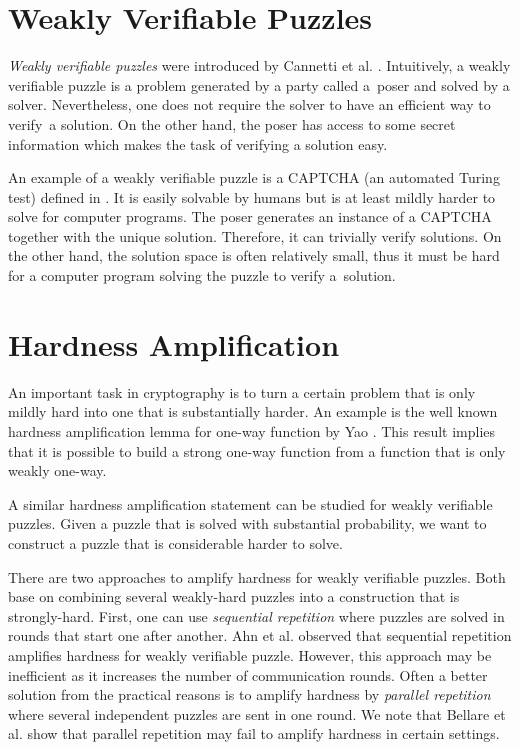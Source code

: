 \section{Weakly Verifiable Puzzles}
\textit{Weakly verifiable puzzles} were introduced by Cannetti et al. \cite{canetti2005hardness}.
Intuitively, a weakly verifiable puzzle is a problem generated by a party called a~poser
and solved by a solver. Nevertheless, one does not require the solver to have an efficient way to verify~a solution.
On the other hand, the poser has access to some secret information which makes the task of verifying a solution easy.

An example of a weakly verifiable puzzle is a CAPTCHA (an automated Turing test) defined in \cite{von2003captcha}.
It is easily solvable by humans but is at least mildly harder to solve for computer programs.
The poser generates an instance of a CAPTCHA together with the unique solution.
Therefore, it can trivially verify solutions.
On the other hand, the solution space is often relatively small,
thus it must be hard for a computer program solving the puzzle to verify a~solution.

\section{Hardness Amplification}
An important task in cryptography is to turn a certain problem that is only mildly hard into one that is substantially harder.
An example is the well known hardness amplification lemma for one-way function by Yao \cite{yao1982theory}.
This result implies that it is possible to build a strong one-way function from a function that is only weakly one-way.

A similar hardness amplification statement can be studied for weakly verifiable puzzles.
Given a puzzle that is solved with substantial probability, we want to construct a puzzle that is considerable harder to solve.

There are two approaches to amplify hardness for weakly verifiable puzzles.
Both base on combining several weakly-hard puzzles into a construction that is strongly-hard.
First, one can use \textit{sequential repetition} where puzzles are solved in rounds that start one after another.
Ahn et al. \cite{von2003captcha} observed that sequential repetition amplifies hardness for weakly verifiable puzzle.
However, this approach may be inefficient as it increases the number of communication rounds.
Often a better solution from the practical reasons is to amplify hardness by \textit{parallel repetition}
where several independent puzzles are sent in one round.
We note that Bellare et al. \cite{bellare1997does} show that parallel repetition may fail to amplify hardness in certain settings.

